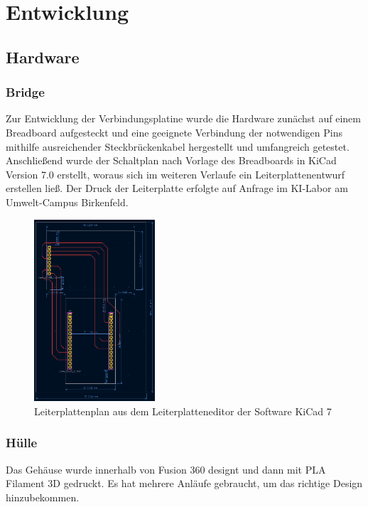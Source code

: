 \documentclass[../main.tex]{subfiles}
\begin{document}
\section{Entwicklung}

\subsection{Hardware}
\subsubsection{Bridge}
Zur Entwicklung der Verbindungsplatine wurde die Hardware zunächst auf einem Breadboard aufgesteckt und eine geeignete Verbindung der notwendigen Pins mithilfe ausreichender Steckbrückenkabel hergestellt und umfangreich getestet. Anschließend wurde der Schaltplan nach Vorlage des Breadboards in KiCad Version 7.0 erstellt, woraus sich im weiteren Verlaufe ein Leiterplattenentwurf erstellen ließ. Der Druck der Leiterplatte erfolgte auf Anfrage im KI-Labor am Umwelt-Campus Birkenfeld.

\begin{figure}[!ht]
    \centering
    \includegraphics[width=0.4\textwidth, angle=-90]{images/leiterplatte.png}
    \caption{Leiterplattenplan aus dem Leiterplatteneditor der Software KiCad 7}
    \label{fig:Bridge}
    \centering
\end{figure}



\subsubsection{Hülle}

Das Gehäuse wurde innerhalb von Fusion 360 designt und dann mit PLA Filament 3D gedruckt. Es hat mehrere Anläufe gebraucht, um das richtige Design hinzubekommen.
\end{document}
